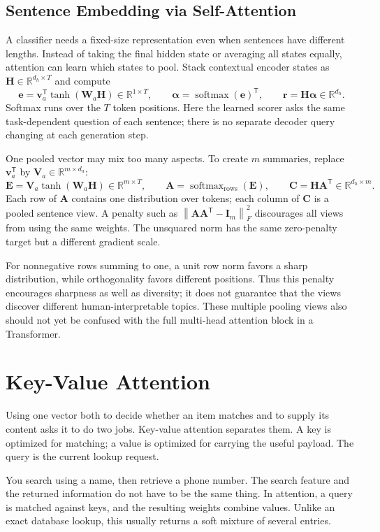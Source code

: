 \documentclass[11pt, oneside]{book}
\newcommand{\R}{\mathbb{R}}
\newcommand{\norm}[1]{\left\lVert #1 \right\rVert}
\newcommand{\T}{^{\mathsf{T}}}           %
\DeclareMathOperator{\softmax}{softmax}
\let\originalsection\section
\renewcommand{\section}{\Needspace{7\baselineskip}\originalsection}
\let\originalsubsection\subsection
\renewcommand{\subsection}{\Needspace{6\baselineskip}\originalsubsection}
\begin{document}
\subsection{Sentence Embedding via Self-Attention}\label{sec:source-4-2-4}
A classifier needs a fixed-size representation even when sentences have different lengths. Instead of taking the final hidden state or averaging all states equally, attention can learn which states to pool. Stack contextual encoder states as $\mathbf{H}\in\R^{d_h\times T}$ and compute
\[
 \mathbf{e}=\mathbf{v}_a\T\tanh(\mathbf{W}_a\mathbf{H})\in\R^{1\times T},\qquad
 \boldsymbol{\alpha}=\softmax(\mathbf{e})\T,\qquad
 \mathbf{r}=\mathbf{H}\boldsymbol{\alpha}\in\R^{d_h}.
\]
Softmax runs over the $T$ token positions. Here the learned scorer asks the same task-dependent question of each sentence; there is no separate decoder query changing at each generation step.

One pooled vector may mix too many aspects. To create $m$ summaries, replace $\mathbf{v}_a\T$ by $\mathbf{V}_a\in\R^{m\times d_a}$:
\[
 \mathbf{E}=\mathbf{V}_a\tanh(\mathbf{W}_a\mathbf{H})\in\R^{m\times T},\qquad
 \mathbf{A}=\softmax_{\mathrm{rows}}(\mathbf{E}),\qquad
 \mathbf{C}=\mathbf{H}\mathbf{A}\T\in\R^{d_h\times m}.
\]
Each row of $\mathbf{A}$ contains one distribution over tokens; each column of $\mathbf{C}$ is a pooled sentence view. A penalty such as $\norm{\mathbf{A}\mathbf{A}\T-\mathbf{I}_m}_F^2$ discourages all views from using the same weights. The unsquared norm has the same zero-penalty target but a different gradient scale.

For nonnegative rows summing to one, a unit row norm favors a sharp distribution, while orthogonality favors different positions. Thus this penalty encourages sharpness as well as diversity; it does not guarantee that the views discover different human-interpretable topics. These multiple pooling views also should not yet be confused with the full multi-head attention block in a Transformer.

\section{Key-Value Attention}\label{sec:source-4-3}
Using one vector both to decide whether an item matches and to supply its content asks it to do two jobs. Key-value attention separates them. A key is optimized for matching; a value is optimized for carrying the useful payload. The query is the current lookup request.

\begin{intbox}[title={A contact list is a useful analogy}]
You search using a name, then retrieve a phone number. The search feature and the returned information do not have to be the same thing. In attention, a query is matched against keys, and the resulting weights combine values. Unlike an exact database lookup, this usually returns a soft mixture of several entries.
\end{intbox}
\end{document}
